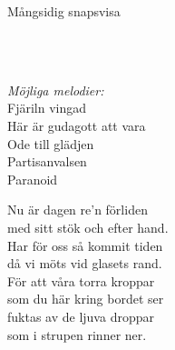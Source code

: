 \begin{song}{Mångsidig snapsvisa}
	
		
	\\
	\\
	\begin{footnotesize}
		\emph{Möjliga melodier:}\\
		\hspace*{3ex}Fjäriln vingad\\
		\hspace*{3ex}Här är gudagott att vara\\
		\hspace*{3ex}Ode till glädjen\\
		\hspace*{3ex}Partisanvalsen\\
		\hspace*{3ex}Paranoid
	\end{footnotesize}
	
	
	Nu är dagen re'n förliden\\
	med sitt stök och efter hand.\\
	Har för oss så kommit tiden\\
	då vi möts vid glasets rand.\\
	För att våra torra kroppar\\
	som du här kring bordet ser\\
	fuktas av de ljuva droppar\\
	som i strupen rinner ner.
	
\end{song}
